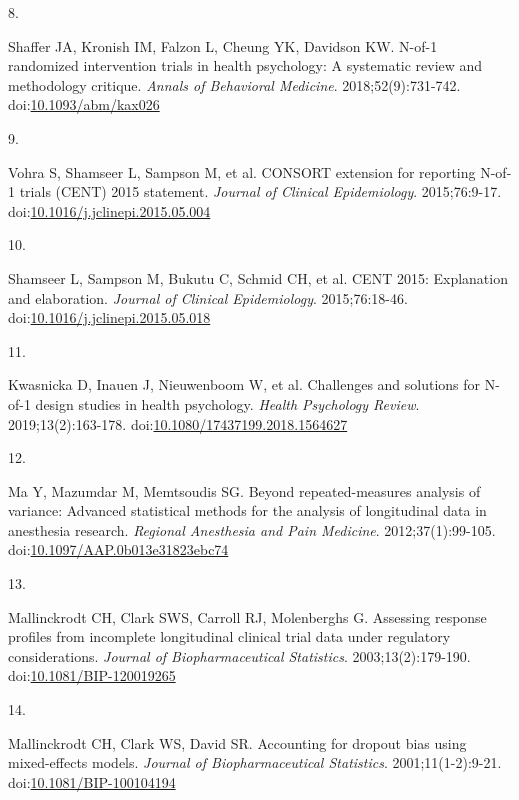 \documentclass[
  11pt,
]{article}
\newlength{\cslhangindent}
\newlength{\csllabelwidth}
\newenvironment{CSLReferences}[2] %
 {\begin{list}{}{%
  \setlength{\itemindent}{0pt}
  \setlength{\leftmargin}{0pt}
  \setlength{\parsep}{0pt}
  \ifodd #1
   \setlength{\leftmargin}{\cslhangindent}
   \setlength{\itemindent}{-1\cslhangindent}
  \fi
  \setlength{\itemsep}{#2\baselineskip}}}
 {\end{list}}
\newcommand{\CSLLeftMargin}[1]{\parbox[t]{\csllabelwidth}{\strut#1\strut}}
\newcommand{\CSLRightInline}[1]{\parbox[t]{\linewidth - \csllabelwidth}{\strut#1\strut}}
\begin{document}
\begin{CSLReferences}{0}{1}
\CSLLeftMargin{8. }%
\CSLRightInline{Shaffer JA, Kronish IM, Falzon L, Cheung YK, Davidson KW. {N}-of-1 randomized intervention trials in health psychology: A systematic review and methodology critique. \emph{Annals of Behavioral Medicine}. 2018;52(9):731-742. doi:\href{https://doi.org/10.1093/abm/kax026}{10.1093/abm/kax026}}

\CSLLeftMargin{9. }%
\CSLRightInline{{Vohra S, Shamseer L, Sampson M, et al.} {CONSORT} extension for reporting {N}-of-1 trials ({CENT}) 2015 statement. \emph{Journal of Clinical Epidemiology}. 2015;76:9-17. doi:\href{https://doi.org/10.1016/j.jclinepi.2015.05.004}{10.1016/j.jclinepi.2015.05.004}}

\CSLLeftMargin{10. }%
\CSLRightInline{{Shamseer L, Sampson M, Bukutu C, Schmid CH, et al.} {CENT} 2015: Explanation and elaboration. \emph{Journal of Clinical Epidemiology}. 2015;76:18-46. doi:\href{https://doi.org/10.1016/j.jclinepi.2015.05.018}{10.1016/j.jclinepi.2015.05.018}}

\CSLLeftMargin{11. }%
\CSLRightInline{{Kwasnicka D, Inauen J, Nieuwenboom W, et al.} Challenges and solutions for {N}-of-1 design studies in health psychology. \emph{Health Psychology Review}. 2019;13(2):163-178. doi:\href{https://doi.org/10.1080/17437199.2018.1564627}{10.1080/17437199.2018.1564627}}

\CSLLeftMargin{12. }%
\CSLRightInline{Ma Y, Mazumdar M, Memtsoudis SG. Beyond repeated-measures analysis of variance: Advanced statistical methods for the analysis of longitudinal data in anesthesia research. \emph{Regional Anesthesia and Pain Medicine}. 2012;37(1):99-105. doi:\href{https://doi.org/10.1097/AAP.0b013e31823ebc74}{10.1097/AAP.0b013e31823ebc74}}

\CSLLeftMargin{13. }%
\CSLRightInline{Mallinckrodt CH, Clark SWS, Carroll RJ, Molenberghs G. Assessing response profiles from incomplete longitudinal clinical trial data under regulatory considerations. \emph{Journal of Biopharmaceutical Statistics}. 2003;13(2):179-190. doi:\href{https://doi.org/10.1081/BIP-120019265}{10.1081/BIP-120019265}}

\CSLLeftMargin{14. }%
\CSLRightInline{Mallinckrodt CH, Clark WS, David SR. Accounting for dropout bias using mixed-effects models. \emph{Journal of Biopharmaceutical Statistics}. 2001;11(1-2):9-21. doi:\href{https://doi.org/10.1081/BIP-100104194}{10.1081/BIP-100104194}}


\end{CSLReferences}
\end{document}
